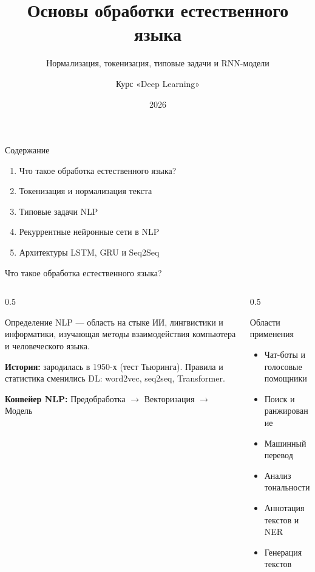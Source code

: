\documentclass[aspectratio=169, 9pt]{beamer}
\title{Основы обработки естественного языка}
\subtitle{Нормализация, токенизация, типовые задачи и RNN-модели}
\author{Курс «Deep Learning»}
\date{2026}
\begin{document}
\begin{frame}
  \titlepage
\end{frame}

\begin{frame}{Содержание}
  \begin{enumerate}
    \item Что такое обработка естественного языка?
    \item Токенизация и нормализация текста
    \item Типовые задачи NLP
    \item Рекуррентные нейронные сети в NLP
    \item Архитектуры LSTM, GRU и Seq2Seq
  \end{enumerate}
\end{frame}

\begin{frame}{Что такое обработка естественного языка?}
  \begin{columns}[T]
    \begin{column}{0.5\textwidth}
      \begin{block}{Определение}
        NLP — область на стыке ИИ, лингвистики и информатики, изучающая методы взаимодействия компьютера и человеческого языка.
      \end{block}
      
      \textbf{История:} зародилась в 1950-х (тест Тьюринга). Правила и статистика сменились DL: word2vec, seq2seq, Transformer.
      
      \vspace{0.3em}
      \textbf{Конвейер NLP:}
      Предобработка $\to$ Векторизация $\to$ Модель
    \end{column}
    \begin{column}{0.5\textwidth}
      \begin{block}{Области применения}
        \begin{itemize}
          \item Чат-боты и голосовые помощники
          \item Поиск и ранжирование
          \item Машинный перевод
          \item Анализ тональности
          \item Аннотация текстов и NER
          \item Генерация текстов
        \end{itemize}
      \end{block}
    \end{column}
  \end{columns}
\end{frame}
\end{document}
